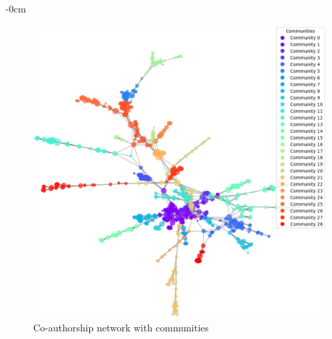 \documentclass[jmse,review,submit,pdftex,moreauthors]{Definitions/mdpi}
\begin{document}
\begin{adjustwidth}{-\extralength}{0cm}
\begin{figure}[H]
	\centering
	\includegraphics[width=\linewidth]{pics/co-authorship_communities.eps}
	\caption{Co-authorship network with communities}\label{fig:fig4}
\end{figure}


\end{adjustwidth}
\end{document}
